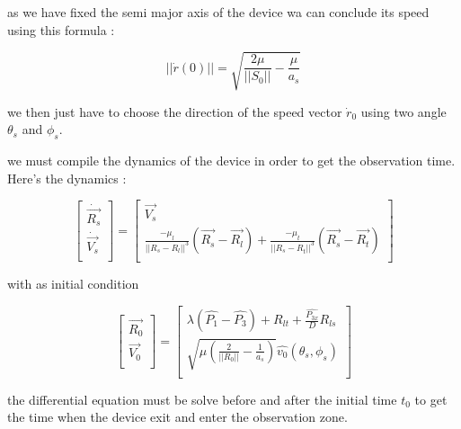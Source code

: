 \documentclass{article} %
\begin{document}
		as we have fixed the semi major axis of the device wa can conclude its speed using this formula :
		
		$$
		||\dot{r}(0)||=\sqrt{\frac{2\mu}{||S_0||}-\frac{\mu}{a_s}}
		$$
		
		
		we then just have to choose the direction of the speed vector $\dot{r}_0$ using two angle $\theta_s$ and $\phi_s$.
		
		
		
		
		we must compile the dynamics of the device in order to get the observation time. Here's the dynamics : 
		
		$$
		\begin{bmatrix}
			\dot{\overrightarrow{R_{s}}}\\
			\dot{\overrightarrow{V_{s}}}\\
		\end{bmatrix} =\begin{bmatrix}
			\overrightarrow{V_{s}}\\
			\frac{-\mu_l }{||R_{s}-R_{l} ||^{3}}(\overrightarrow{R_{s}}-\overrightarrow{R_{l}}) + \frac{-\mu_t }{||R_{s}-R_{t} ||^{3}}(\overrightarrow{R_{s}}-\overrightarrow{R_{t}})\\
		\end{bmatrix}
		$$
		
		with as initial condition
		
		$$
		\begin{bmatrix}
			\overrightarrow{R_{0}}\\
			\overrightarrow{V_{0}}\\
		\end{bmatrix} =\begin{bmatrix}
			\lambda \left(\widehat{P_{1}} -\widehat{P_{3}}\right) +R_{lt} +\frac{\widehat{P_{3x}}}{D} R_{ls}\\
			\sqrt{\mu \left(\frac{2}{||R_{0} ||} -\frac{1}{a_s}\right)}\widehat{v_{0}}( \theta _{s} ,\phi _{s})\\
		\end{bmatrix}
		$$
		
		the differential equation must be solve before and after the initial time $t_0$ to get the time when the device exit and enter the observation zone.
		
\end{document}
